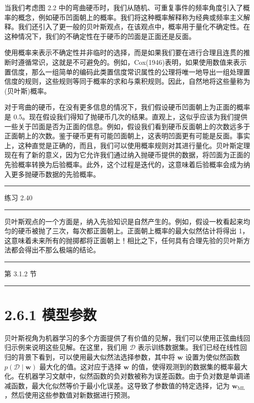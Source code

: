 \documentclass[10pt]{report}
\newcommand{\HRule}{\begin{center}\rule{0.9\linewidth}{0.2mm}\end{center}}
\begin{document}
当我们考虑图 2.2 中的弯曲硬币时，我们从随机、可重复事件的频率角度引入了概率的概念，例如硬币凹面朝上的概率。我们将这种概率解释称为经典或频率主义解释。我们还引入了更一般的贝叶斯观点，在该观点中，概率用于量化不确定性。在这种情况下，我们的不确定性在于硬币的凹面是正面还是反面。

使用概率来表示不确定性并非临时的选择，而是如果我们要在进行合理且连贯的推断时遵循常识，这就是不可避免的。例如，Cox(1946)表明，如果使用数值来表示置信度，那么一组简单的编码此类置信度常识属性的公理将唯一地导出一组处理置信度的规则，这些规则等同于概率的求和与乘积规则。因此，自然地将这些量称为(贝叶斯)概率。

对于弯曲的硬币，在没有更多信息的情况下，我们假设硬币凹面朝上为正面的概率是 0.5。现在假设我们得知了抛硬币几次的结果。直观上，这似乎应该为我们提供一些关于凹面是否为正面的信息。例如，假设我们看到硬币反面朝上的次数远多于正面朝上的次数。鉴于硬币更有可能凹面朝上，这表明凹面更有可能是反面。事实上，这种直觉是正确的，而且，我们可以使用概率规则对其进行量化。贝叶斯定理现在有了新的意义，因为它允许我们通过纳入抛硬币提供的数据，将凹面为正面的先验概率转换为后验概率。此外，这个过程是迭代的，这意味着后验概率会成为纳入更多抛硬币数据的先验概率。

\HRule

练习 2.40

\HRule

贝叶斯观点的一个方面是，纳入先验知识是自然产生的。例如，假设一枚看起来均匀的硬币被抛了三次，每次都正面朝上。正面朝上概率的最大似然估计将得出 1，这意味着未来所有的抛掷都将正面朝上！相比之下，任何具有合理先验的贝叶斯方法都会得出不那么极端的结论。

\HRule

第 3.1.2 节

\HRule

\section*{2.6.1 模型参数}

贝叶斯视角为机器学习的多个方面提供了有价值的见解，我们可以使用正弦曲线回归示例来说明这些见解。在这里，我们用 \(\mathcal{D}\) 表示训练数据集。我们已经在线性回归的背景下看到，可以使用最大似然法选择参数，其中将 \(\mathbf{w}\) 设置为使似然函数 \(p\left( {\mathcal{D} \mid  \mathbf{w}}\right)\) 最大化的值。这对应于选择 \(\mathbf{w}\) 的值，使得观测到的数据集的概率最大化。在机器学习文献中，似然函数的负对数被称为误差函数。由于负对数是单调递减函数，最大化似然等价于最小化误差。这导致了参数值的特定选择，记为 \({\mathbf{w}}_{\mathrm{{ML}}}\) ，然后使用这些参数值对新数据进行预测。
\end{document}
